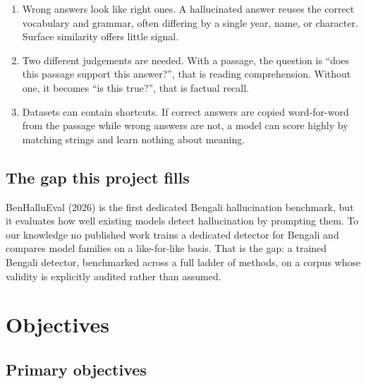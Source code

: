 \documentclass[12pt,a4paper]{article}
\begin{document}
\begin{enumerate}[leftmargin=*,itemsep=3pt]
  \item Wrong answers look like right ones. A hallucinated answer
  reuses the correct vocabulary and grammar, often differing by a single year,
  name, or character. Surface similarity offers little signal.

  \item Two different judgements are needed. With a passage, the
  question is ``does this passage support this answer?'', that is reading
  comprehension. Without one, it becomes ``is this true?'', that is factual recall.

  \item Datasets can contain shortcuts. If correct answers are copied
  word-for-word from the passage while wrong answers are not, a model can score
  highly by matching strings and learn nothing about meaning.

\end{enumerate}

\subsection{The gap this project fills}

BenHalluEval (2026) is the first dedicated Bengali hallucination benchmark, but
it evaluates how well existing models detect hallucination by prompting
them. To our knowledge no published work trains a dedicated detector for
Bengali and compares model families on a like-for-like basis. That is the gap: a
trained Bengali detector, benchmarked across a full ladder of methods, on a
corpus whose validity is explicitly audited rather than assumed.

\section{Objectives}

\subsection{Primary objectives}
\end{document}
